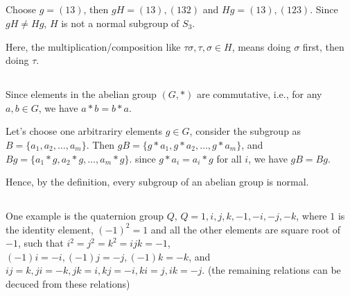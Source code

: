 \documentclass[12pt]{article}
\begin{document}
\subsection{} %
Choose $g=(13)$, then $gH={(13),(132)}$ and $Hg={(13),(123)}$. Since $gH\ne Hg$, $H$ is not a normal subgroup of $S_3$.

Here, the multiplication/composition like $\tau\sigma,\tau,\sigma\in H$, means doing $\sigma$ first, then doing $\tau$.
\subsection{} %
Since elements in the abelian group $(G,*)$ are commutative, i.e., for any $a,b\in G$, we have $a*b=b*a$.

Let's choose one arbitrariry elements $g\in G$, consider the subgroup as $B=\{a_1,a_2,\dots,a_m\}$. Then $gB=\{g*a_1,g*a_2,\dots,g*a_m\}$, and $Bg=\{a_1*g,a_2*g,\dots,a_m*g\}$. since $g*a_i=a_i*g$ for all $i$, we have $gB=Bg$.

Hence, by the definition, every subgroup of an abelian group is normal.
\subsection{} %
One example is the quaternion group $Q$, $Q={1,i,j,k,-1,-i,-j,-k}$, where $1$ is the identity element, $(-1)^2=1$ and all the other elements are square root of $-1$, such that $i^2=j^2=k^2=ijk=-1$, $(-1)i=-i,(-1)j=-j, (-1)k=-k$, and $ij=k,ji=-k,jk=i,kj=-i,ki=j,ik=-j$. (the remaining relations can be decuced from these relations)
\end{document}
